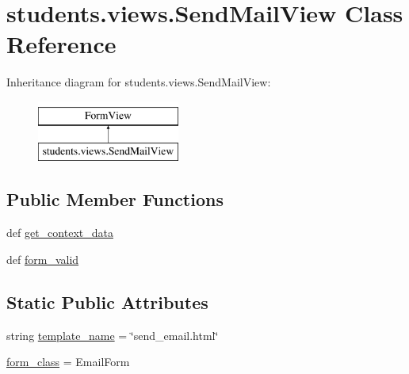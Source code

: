 \hypertarget{classstudents_1_1views_1_1_send_mail_view}{\section{students.\-views.\-Send\-Mail\-View Class Reference}
\label{classstudents_1_1views_1_1_send_mail_view}
}
Inheritance diagram for students.\-views.\-Send\-Mail\-View\-:\begin{figure}[H]
\begin{center}
\leavevmode
\includegraphics[height=2.000000cm]{classstudents_1_1views_1_1_send_mail_view}
\end{center}
\end{figure}
\subsection*{Public Member Functions}
\begin{DoxyCompactItemize}
\item 
def \hyperlink{classstudents_1_1views_1_1_send_mail_view_a41cb4edae96b73f4a14a62bbe3e02b3f}{get\-\_\-context\-\_\-data}
\item 
def \hyperlink{classstudents_1_1views_1_1_send_mail_view_a1a31847593c140f09be550af7e3db59a}{form\-\_\-valid}
\end{DoxyCompactItemize}
\subsection*{Static Public Attributes}
\begin{DoxyCompactItemize}
\item 
string \hyperlink{classstudents_1_1views_1_1_send_mail_view_a4441809c3bd7f631af7c5c4ccfed95e2}{template\-\_\-name} = \char`\"{}send\-\_\-email.\-html\char`\"{}
\item 
\hyperlink{classstudents_1_1views_1_1_send_mail_view_a66913d97023f49153b9f5aea5fa1fdc9}{form\-\_\-class} = Email\-Form
\end{DoxyCompactItemize}


